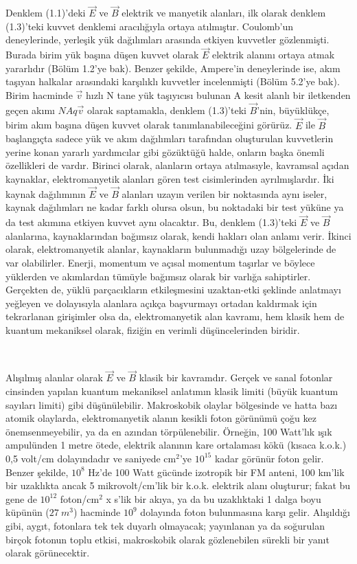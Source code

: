 Denklem (1.1)'deki $\Vec{E}$ ve $\Vec{B}$ elektrik ve manyetik alanları, ilk olarak denklem (1.3)'teki kuvvet denklemi aracılığıyla ortaya atılmıştır. Coulomb'un deneylerinde, yerleşik yük dağılımları arasında etkiyen kuvvetler gözlenmişti. Burada birim yük başına düşen kuvvet olarak $\Vec{E}$ elektrik alanını ortaya atmak yararlıdır (Bölüm 1.2'ye bak). Benzer şekilde, Ampere'in deneylerinde ise, akım taşıyan halkalar arasındaki karşılıklı kuvvetler incelenmişti (Bölüm 5.2'ye bak). Birim hacminde $\Vec{v}$ hızlı N tane yük taşıyıcısı bulunan A kesit alanlı bir iletkenden geçen akımı $NAq \Vec{v}$ olarak saptamakla, denklem (1.3)'teki $\Vec{B}$'nin, büyüklükçe, birim akım başına düşen kuvvet olarak tanımlanabileceğini görürüz. $\Vec{E}$ ile $\Vec{B}$ başlangıçta sadece yük ve akım dağılımları tarafından oluşturulan kuvvetlerin yerine konan yararlı yardımcılar gibi gözüktüğü halde, onların başka önemli özellikleri de vardır. Birinci olarak, alanların ortaya atılmasıyle, kavramsal açıdan kaynaklar, elektromanyetik alanları gören test cisimlerinden ayrılmışlardır.
İki kaynak dağılımının $\Vec{E}$ ve $\Vec{B}$ alanları uzayın verilen bir noktasında aynı iseler, kaynak dağılımları ne kadar farklı olursa olsun, bu noktadaki bir test yüküne ya da test akımına etkiyen kuvvet aynı olacaktır. Bu, denklem (1.3)'teki $\Vec{E}$ ve $\Vec{B}$ alanlarına, kaynaklarından bağımsız olarak, kendi hakları olan anlamı verir. İkinci olarak, elektromanyetik alanlar, kaynakların bulunmadığı uzay bölgelerinde de var olabilirler. Enerji, momentum ve açısal momentum taşırlar ve böylece yüklerden ve akımlardan tümüyle bağımsız olarak bir varlığa sahiptirler. Gerçekten de, yüklü parçacıkların etkileşmesini uzaktan-etki şeklinde anlatmayı yeğleyen ve dolayısıyla alanlara açıkça başvurmayı ortadan kaldırmak için tekrarlanan girişimler olsa da, elektromanyetik alan kavramı, hem klasik hem de kuantum mekaniksel olarak, fiziğin en verimli düşüncelerinden biridir.

\

Alışılmış alanlar olarak $\Vec{E}$ ve $\Vec{B}$ klasik bir kavramdır. Gerçek ve sanal fotonlar cinsinden yapılan kuantum mekaniksel anlatımın klasik limiti (büyük kuantum sayıları limiti) gibi düşünülebilir. Makroskobik olaylar bölgesinde ve hatta bazı atomik olaylarda, elektromanyetik alanın kesikli foton görünümü çoğu kez önemsenmeyebilir, ya da en azından törpülenebilir. Örneğin, 100 Watt'lık ışık ampulünden 1 metre ötede, elektrik alanının kare ortalaması kökü (kısaca k.o.k.) 0,5 volt/cm dolayındadır ve saniyede cm$^{2}$'ye $10^{15}$ kadar görünür foton gelir. Benzer şekilde, $10^{8}$ Hz'de 100 Watt gücünde izotropik bir FM anteni, 100 km'lik bir uzaklıkta ancak 5 mikrovolt/cm'lik bir k.o.k. elektrik alanı oluşturur; fakat bu gene de $10^{12}$ foton/cm$^{2}$ x s'lik bir akıya, ya da bu uzaklıktaki 1 dalga boyu küpünün ($27 \ m^{3}$) hacminde $10^{9}$ dolayında foton bulunmasına karşı gelir. Alışıldığı gibi, aygıt, fotonlara tek tek duyarlı olmayacak; yayınlanan ya da soğurulan birçok fotonun toplu etkisi, makroskobik olarak gözlenebilen sürekli bir yanıt olarak görünecektir.

